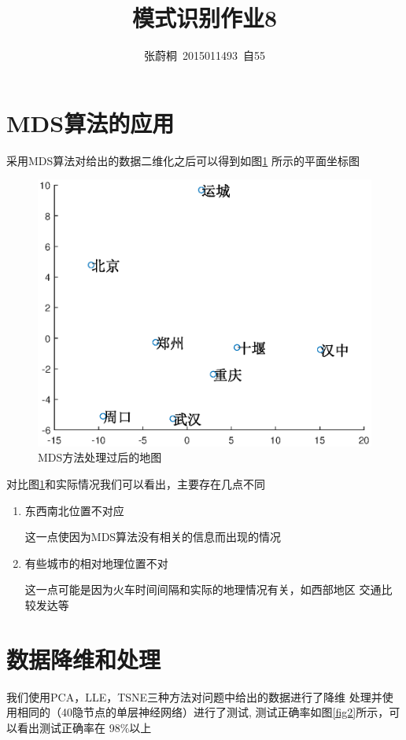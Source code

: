 \documentclass[UTF8,a4paper]{paper}
\title{模式识别作业8}
\author{张蔚桐\ 2015011493\ 自55}
\begin{document}
\maketitle
\section{MDS算法的应用}
采用MDS算法对给出的数据二维化之后可以得到如图\ref{fig1}
所示的平面坐标图

\begin{figure}
\centering
\includegraphics[width=\textwidth]{map.eps}
\caption{MDS方法处理过后的地图}
\label{fig1}
\end{figure}

对比图\ref{fig1}和实际情况我们可以看出，主要存在几点不同
\begin{enumerate}
\item 东西南北位置不对应

这一点使因为MDS算法没有相关的信息而出现的情况

\item 有些城市的相对地理位置不对

这一点可能是因为火车时间间隔和实际的地理情况有关，如西部地区
交通比较发达等

\end{enumerate}

\section{数据降维和处理}
我们使用PCA，LLE，TSNE三种方法对问题中给出的数据进行了降维
处理并使用相同的（40隐节点的单层神经网络）进行了测试,
测试正确率如图\ref{fig2}所示，可以看出测试正确率在
98\%以上
\end{document}
